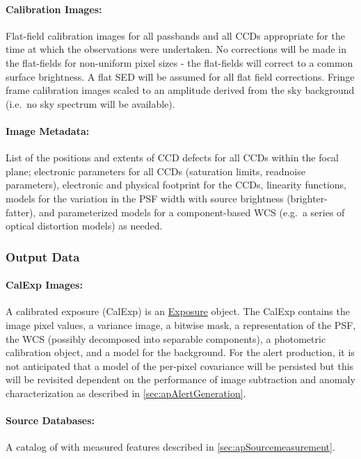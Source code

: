 \paragraph*{Calibration Images:} Flat-field calibration images for all passbands and all CCDs appropriate for the time at which the observations were undertaken. No corrections will be made in the flat-fields for non-uniform pixel sizes - the flat-fields will correct to a common  surface brightness. A flat SED will be assumed for all flat field corrections. Fringe frame calibration images scaled to an amplitude derived from the sky background (i.e.\ no sky spectrum will be available).

\paragraph*{Image Metadata:} List of the positions and extents of CCD defects for all CCDs within the focal plane; electronic parameters for all CCDs (saturation limits, readnoise parameters), electronic and physical footprint for the CCDs, linearity functions, models for the variation in the PSF width with source brightness (brighter-fatter), and parameterized models for a component-based  WCS (e.g.\ a series of optical distortion models) as needed.

\subsubsection{Output Data}
\label{sec:apSFMoutput}

\paragraph*{CalExp Images:} A calibrated exposure (CalExp) is an \hyperref[sec:spImagesExposure]{Exposure} object. The CalExp contains the image pixel values, a variance image, a bitwise mask, a representation of the PSF, the WCS (possibly decomposed into separable components), a photometric calibration object, and a model for the  background. For the alert production, it is not anticipated that a model of the per-pixel covariance will be persisted but this will be revisited dependent on the performance of image subtraction and anomaly characterization as described in \ref{sec:apAlertGeneration}.

\paragraph*{Source Databases:} A catalog of \Sources with measured features described in \ref{sec:apSourcemeasurement}.

